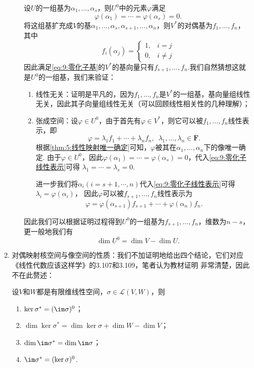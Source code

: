 \begin{enumerate}
\begin{enumerate}
        设$U$的一组基为$\alpha_1,\ldots,\alpha_s$，则$U^0$中的元素$\varphi$满足
        \begin{equation}\label{eq:9:零化子基}
            \varphi(\alpha_1)=\cdots=\varphi(\alpha_s)=0.
        \end{equation}
        将这组基扩充成$V$的基$\alpha_1,\ldots,\alpha_s,\alpha_{s+1},\ldots,\alpha_n$，则$V^*$的对偶基为$f_1,\ldots,f_n$，
        其中\[f_i(\alpha_j)=\begin{cases}
            1, & i=j \\
            0, & i\neq j
        \end{cases}\]
        因此满足\autoref{eq:9:零化子基}的$V^*$的基向量只有$f_{s+1},\ldots,f_n$.我们自然猜想这就是$U^0$的一组基，我们来验证：
        \begin{enumerate}
            \item 线性无关：证明是平凡的，因为$f_1,\ldots,f_n$是$V^*$的一组基，基向量组线性无关，因此其子向量组线性无关（可以回顾线性相关性的几种理解）；
            \item 张成空间：设$\varphi\in U^0$，由于首先有$\varphi\in V^*$，则它可以被$f_1,\ldots,f_n$线性表示，即
            \begin{equation}\label{eq:9:零化子线性表示}
                \varphi=\lambda_1f_1+\cdots+\lambda_nf_n,\enspace \lambda_1,\ldots,\lambda_n\in\mathbf{F}.
            \end{equation}
            根据\autoref{thm:5:线性映射唯一确定}可知，$\varphi$被其在$\alpha_1,\ldots,\alpha_n$下的像唯一确定.
            由于$\varphi\in U^0$，因此$\varphi(\alpha_1)=\cdots=\varphi(\alpha_s)=0$，代入\autoref{eq:9:零化子线性表示}可得
            $\lambda_1=\cdots=\lambda_s=0$.

            进一步我们将$\alpha_{i}(i=s+1,\cdots,n)$代入\autoref{eq:9:零化子线性表示}可得$\lambda_{i}=\varphi(\alpha_i)$，
            因此$\varphi$可以被$f_{s+1},\ldots,f_n$线性表示为
            \[\varphi=\varphi(\alpha_{s+1})f_{s+1}+\cdots+\varphi(\alpha_n)f_n.\]
        \end{enumerate}
        因此我们可以根据证明过程得到$U^0$的一组基为$f_{s+1},\ldots,f_n$，维数为$n-s$，更一般地我们有
        \[\dim U^0=\dim V-\dim U.\]
    \end{enumerate}
    \item 对偶映射核空间与像空间的性质：我们不加证明地给出四个结论，它们对应《线性代数应该这样学》的3.107和3.109，笔者认为教材证明
    非常清楚，因此不在此赘述：
    \begin{theorem}\label{thm:9:对偶映射像和核的性质}
        设$V$和$W$都是有限维线性空间，$\sigma\in\mathcal{L}(V,W)$，则
        \begin{enumerate}[label=(\arabic*)]
            \item $\ker\sigma^*=(\im\sigma)^0$；
            \item $\dim\ker\sigma^*=\dim\ker\sigma+\dim W-\dim V$；
            \item $\dim\im\sigma^*=\dim\im\sigma$；
            \item $\im\sigma^*=(\ker\sigma)^0$.
        \end{enumerate}
    \end{theorem}


\end{enumerate}
